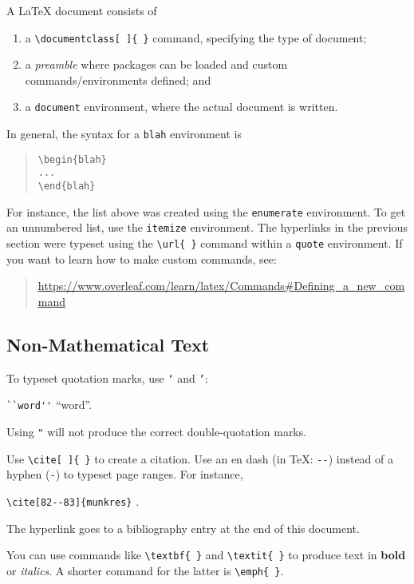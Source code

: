 \documentclass[a4paper,10pt,leqno]{article}
\numberwithin{equation}{section}
\theoremstyle{plain}
\theoremstyle{definition}
\theoremstyle{remark}
\begin{document}
A \LaTeX{} document consists of
\begin{enumerate} 
\item 	a \verb|\documentclass[ ]{ }| command, specifying the type of document; 

\item 	a \emph{preamble} where packages can be loaded and custom commands/environments defined; and

\item 	a \texttt{document} environment, where the actual document is written.

\end{enumerate}
In general, the syntax for a \texttt{blah} environment is
\begin{quote}
\verb|\begin{blah}|\\
\verb|...|\\
\verb|\end{blah}|
\end{quote}
For instance, the list above was created using the \texttt{enumerate} environment.
To get an unnumbered list, use the \texttt{itemize} environment.
The hyperlinks in the previous section were typeset using the \verb|\url{ }| command within a \texttt{quote} environment.
If you want to learn how to make custom commands, see:
\begin{quote}
\url{https://www.overleaf.com/learn/latex/Commands#Defining_a_new_command}
\end{quote}

\subsection{Non-Mathematical Text}

To typeset quotation marks, use \texttt{`} and \texttt{'}:
\begin{center}
\verb|``word''|
\quad
``word''.
\end{center}
Using \texttt{"} will not produce the correct double-quotation marks.

Use \texttt{\textbackslash{}cite[ ]\{ \}} to create a citation.
Use an en dash (in \TeX: \texttt{-{}-}) instead of a hyphen (\texttt{-}) to typeset page ranges.
For instance,
\begin{center}
\verb|\cite[82--83]{munkres}|
\quad
\cite[82--83]{munkres}.
\end{center}
The hyperlink goes to a bibliography entry at the end of this document.

You can use commands like \verb|\textbf{ }| and  \verb|\textit{ }| to produce text in \textbf{bold} or \textit{italics}.
A shorter command for the latter is \verb|\emph{ }|.
\end{document}
